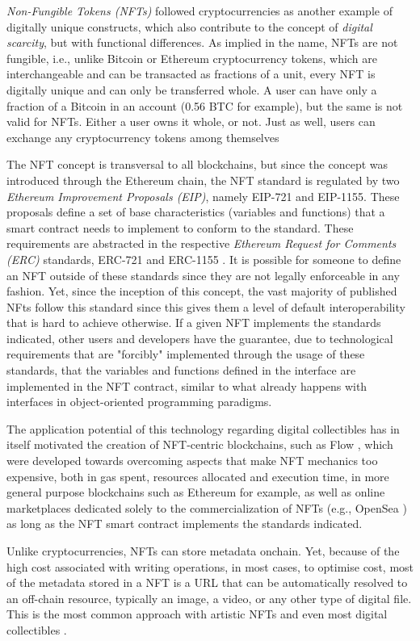 \documentclass[../3_VotingAndNFTs.tex]{subfiles}
\begin{document}
    \textit{Non-Fungible Tokens (NFTs)} followed cryptocurrencies as another example of digitally unique constructs, which also contribute to the concept of \textit{digital scarcity}, but with functional differences. As implied in the name, NFTs are not fungible, i.e., unlike Bitcoin or Ethereum cryptocurrency tokens, which are interchangeable and can be transacted as fractions of a unit, every NFT is digitally unique and can only be transferred whole. A user can have only a fraction of a Bitcoin in an account (0.56 BTC for example), but the same is not valid for NFTs. Either a user owns it whole, or not. Just as well, users can exchange any cryptocurrency tokens among themselves 
    \par
    The NFT concept is transversal to all blockchains, but since the concept was introduced through the Ethereum chain, the NFT standard is regulated by two \textit{Ethereum Improvement Proposals (EIP)}, namely EIP-721 and EIP-1155. These proposals define a set of base characteristics (variables and functions) that a smart contract needs to implement to conform to the standard. These requirements are abstracted in the respective \textit{Ethereum Request for Comments (ERC)} standards, ERC-721 \cite{ERC721} and ERC-1155 \cite{ERC1155}. It is possible for someone to define an NFT outside of these standards since they are not legally enforceable in any fashion. Yet, since the inception of this concept, the vast majority of published NFts follow this standard since this gives them a level of default interoperability that is hard to achieve otherwise. If a given NFT implements the standards indicated, other users and developers have the guarantee, due to technological requirements that are "forcibly" implemented through the usage of these standards, that the variables and functions defined in the interface are implemented in the NFT contract, similar to what already happens with interfaces in object-oriented programming paradigms.
    \par
    The application potential of this technology regarding digital collectibles has in itself motivated the creation of NFT-centric blockchains, such as Flow \cite{Hentschel2019a}, which were developed towards overcoming aspects that make NFT mechanics too expensive, both in gas spent, resources allocated and execution time, in more general purpose blockchains such as Ethereum for example, as well as online marketplaces dedicated solely to the commercialization of NFTs (e.g., OpenSea \cite{OpenSea2024}) as long as the NFT smart contract implements the standards indicated.
    \par
    Unlike cryptocurrencies, NFTs can store metadata onchain. Yet, because of the high cost associated with writing operations, in most cases, to optimise cost, most of the metadata stored in a NFT is a URL that can be automatically resolved to an off-chain resource, typically an image, a video, or any other type of digital file. This is the most common approach with artistic NFTs and even most digital collectibles \cite{Trautman2022}.
\end{document}
